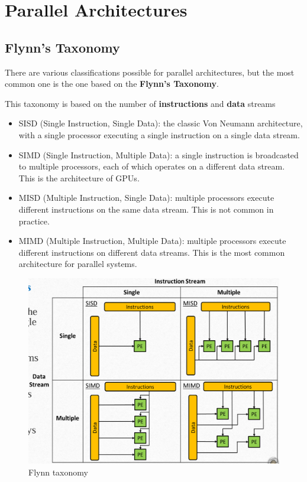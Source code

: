 \chapter{Parallel Architectures}

\section{Flynn's Taxonomy}
There are various classifications possible for parallel architectures, but the most common one is the one based on the \textbf{Flynn's Taxonomy}.

This taxonomy is based on the number of \textbf{instructions} and \textbf{data} streams
\begin{paracol}{2}
   
   \begin{itemize}
      \item SISD (Single Instruction, Single Data): the classic Von Neumann architecture, with a single processor executing a single instruction on a single data stream.
      \item SIMD (Single Instruction, Multiple Data): a single instruction is broadcasted to multiple processors, each of which operates on a different data stream. This is the architecture of GPUs.
      \item MISD (Multiple Instruction, Single Data): multiple processors execute different instructions on the same data stream. This is not common in practice.
      \item MIMD (Multiple Instruction, Multiple Data): multiple processors execute different instructions on different data streams. This is the most common architecture for parallel systems.
   \end{itemize}
   
   \switchcolumn

   \begin{figure}[htbp]
      \centering
      \includegraphics[width=0.95\columnwidth]{images/03/flynn.png}
      \caption{Flynn taxonomy}
      \label{fig:03/flynn}
   \end{figure}
\end{paracol}


